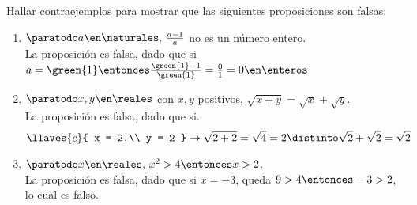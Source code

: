 \begin{enunciado}{\ejercicio}

Hallar contraejemplos para mostrar que las siguientes proposiciones son falsas:

\end{enunciado}

\begin{enumerate}[label=\roman*)]
	\item $\paratodo a \en \naturales,\, \frac{a-1}{a}$ no es un número entero.\\
            La proposición es falsa, dado que si 
                $a = \green{1}
                \entonces
                \frac{\green{1} - 1}{\green{1}} =
                \frac{0}{1} =
                0 \en \enteros$

	\item $\paratodo x, y \en \reales$ con $x, y$ positivos, $\sqrt{x+y} = \sqrt{x} + \sqrt{y}$.\\
	      La proposición es falsa, dado que si.\\
	      \[
		      \llaves{c}{
			      x = 2.\\
			      y = 2
          } \to \sqrt{2 + 2} = \sqrt{4} = 2 \distinto \sqrt{2} + \sqrt{2} = \sqrt{2}
	      \]

	\item $\paratodo x \en \reales,\, x^2 > 4 \entonces x > 2$.\\
	      La  proposición es falsa, dado que si $x = -3$, queda $9 > 4 \entonces -3 > 2$, lo cual es falso.
\end{enumerate}

